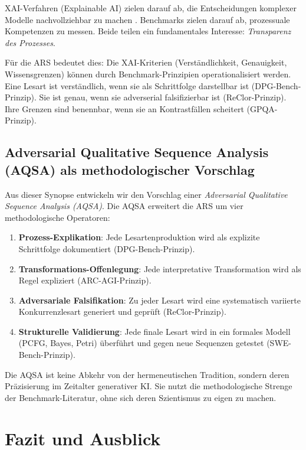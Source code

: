 \documentclass[12pt,a4paper]{article}
\begin{document}
XAI-Verfahren (Explainable AI) zielen darauf ab, die Entscheidungen komplexer Modelle nachvollziehbar zu machen \cite{barredo2020xai}. Benchmarks zielen darauf ab, prozessuale Kompetenzen zu messen. Beide teilen ein fundamentales Interesse: \textit{Transparenz des Prozesses}.

Für die ARS bedeutet dies: Die XAI-Kriterien (Verständlichkeit, Genauigkeit, Wissensgrenzen) \cite{ortigossa2024xai} können durch Benchmark-Prinzipien operationalisiert werden. Eine Lesart ist verständlich, wenn sie als Schrittfolge darstellbar ist (DPG-Bench-Prinzip). Sie ist genau, wenn sie adverserial falsifizierbar ist (ReClor-Prinzip). Ihre Grenzen sind benennbar, wenn sie an Kontrastfällen scheitert (GPQA-Prinzip).

\subsection{Adversarial Qualitative Sequence Analysis (AQSA) als methodologischer Vorschlag}

Aus dieser Synopse entwickeln wir den Vorschlag einer \textit{Adversarial Qualitative Sequence Analysis (AQSA)}. Die AQSA erweitert die ARS um vier methodologische Operatoren:

\begin{enumerate}
    \item \textbf{Prozess-Explikation}: Jede Lesartenproduktion wird als explizite Schrittfolge dokumentiert (DPG-Bench-Prinzip).
    \item \textbf{Transformations-Offenlegung}: Jede interpretative Transformation wird als Regel expliziert (ARC-AGI-Prinzip).
    \item \textbf{Adversariale Falsifikation}: Zu jeder Lesart wird eine systematisch variierte Konkurrenzlesart generiert und geprüft (ReClor-Prinzip).
    \item \textbf{Strukturelle Validierung}: Jede finale Lesart wird in ein formales Modell (PCFG, Bayes, Petri) überführt und gegen neue Sequenzen getestet (SWE-Bench-Prinzip).
\end{enumerate}

Die AQSA ist keine Abkehr von der hermeneutischen Tradition, sondern deren Präzisierung im Zeitalter generativer KI. Sie nutzt die methodologische Strenge der Benchmark-Literatur, ohne sich deren Szientismus zu eigen zu machen.

\section{Fazit und Ausblick}
\end{document}
